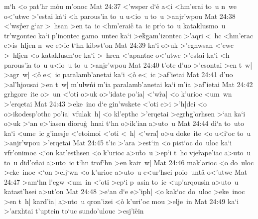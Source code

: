 m`h
<o
pat'hr
m\r{o}u
m'onoc\bibvsend
\vs Mat 24:37
<'wsper
d`e\r{}
a<i
<hm'erai
to~u
n~we
o<'utwc
>'estai
k\r{a}`i
<h
parous'ia
to~u
u<io~u
to~u
>anjr'wpou\bibvsend
\vs Mat 24:38
<'ws\r{p}er
g`ar
>~hsan
>en
ta~ic
<hm'erai\r{c}
ta~ic
pr`o
to~u
kataklusmo~u
tr'wgontec
ka`i
p'inontec
gamo~untec
ka`i
>e\r{k}gam'izontec
>'aqri
<~hc
<hm'erac
e>is~hljen
n~we
e>ic
t`hn
kibwt'on\bibvsend
\vs Mat 24:39
ka`i
o>uk
>'egnwsan
<'ewc
>~hljen
<o
kataklusm`oc
ka`i
>~hren
<'apantac
o<'utwc
>'estai
ka`i
<h
parous'ia
to~u
u<io~u
to~u
>anjr'wpou\bibvsend
\vs Mat 24:40
t'ote
d'uo
>'esontai
>en
t~w|
>agr~w|
<o\r{}
e<~ic
paralamb'anetai
ka`i
<o\r{}
e<~ic
>af'ietai\bibvsend
\vs Mat 24:41
d'uo
>al'hjousai
>en
t~w|
m'ulw\r{n}i
m'ia
paralamb'anetai
ka`i
m'ia
>af'ietai\bibvsend
\vs Mat 24:42
grhgore~ite
o>~un
<'oti
o>uk
o>'idate
po'ia|
<'w\r{r}a|
<o
k'urioc
<um~wn
>'erqetai\bibvsend
\vs Mat 24:43
>eke~ino
d`e
gin'wskete
<'oti
e>i
>'h|dei
<o
o>ikodesp'othc
po'ia|
vfulak~h|
<o
kl'epthc
>'erqetai
>egrhg'orhsen
>`an
ka`i
o>uk
>`an
e>'iasen
dioru\r{g}~hnai
t`hn
o>ik'ian
a>uto~u\bibvsend
\vs Mat 24:44
di`a
to~uto
ka`i
<ume~ic
g'inesje
<'etoimoi
<'oti
<~h|
<'wra|\r{}
o>u
doke~ite
<o
u<i`oc
to~u
>anjr'wpou
>'erqetai\bibvsend
\vs Mat 24:45
t'ic
>'ara
>est`in
<o
pist`oc
do~uloc
ka`i
vfr'onimoc
<`on
kat'esthsen
<o
k'urioc
a>u\r{t}o~u
>ep`i
t~hc
vje\r{r}ape'iac
a>uto~u
to~u
did'o\r{n}ai
a>uto~ic
t`hn
trof`hn
>en
kair~w|\bibvsend
\vs Mat 24:46
mak'arioc
<o
do~uloc
>eke~inoc
<`on
>elj`wn
<o
k'urioc
a>uto~u
e<ur'hsei
poio~unta\r{}
o<'utwc\bibvsend
\vs Mat 24:47
>am`hn
l'egw
<um~in
<'oti
>ep`i
p~asin
to~ic
<up'arqousin
a>uto~u
katast'hsei
a>ut'on\bibvsend
\vs Mat 24:48
>e`an
d`e
e>'iph|
<o
kak`oc
do~uloc
>eke~inoc
>en
t~h|
kard'ia|
a>uto~u
qron'izei
<o\r{}
k'uri'oc
mou
>elje~in\bibvsend
\vs Mat 24:49
ka`i
>'arxhtai
t'uptein
to`uc
sundo'ulouc
>esj'i\r{e}in
